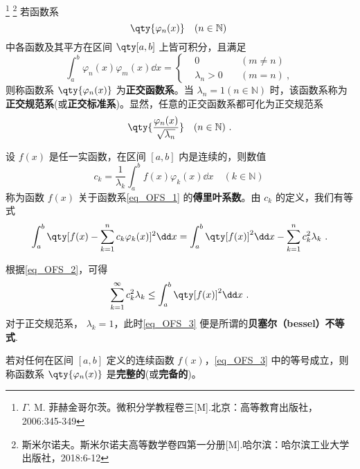 

\footnote{$\Gamma$. M. 菲赫金哥尔茨。微积分学教程\;卷三[M].北京：高等教育出版社，2006:345-349}
\footnote{斯米尔诺夫。斯米尔诺夫高等数学卷四第一分册[M].哈尔滨：哈尔滨工业大学出版社，2018:6-12}
若函数系 
\begin{equation}\label{eq_OFS_1}
\qty{\varphi_n(x)}\quad(n\in \mathbb{N})~
\end{equation}
中各函数及其平方在区间 $\qty[a,b]$ 上皆可积分，且满足
\begin{equation}
\int_a^b\varphi_n(x)\varphi_m(x)\dd x=
\left\{
    \begin{aligned}
    &0\quad &(m\neq n)\\
   &\lambda_n>0\quad &(m=n)~,
    \end{aligned}
\right.
\end{equation}
则称函数系 $\qty{\varphi_n(x)}$ 为\textbf{正交函数系}。当 $\lambda_n=1(n\in\mathbb{N})$ 时，该函数系称为\textbf{正交规范系}(或\textbf{正交标准系})。显然，任意的正交函数系都可化为正交规范系 
\begin{equation}\label{eq_OFS_4}
\qty{\frac{\varphi_n(x)}{\sqrt{\lambda_n}}}\quad(n\in \mathbb{N})~.
\end{equation}

设 $f(x)$ 是任一实函数，在区间 $[a,b]$ 内是连续的，则数值
\begin{equation}
c_k=\frac{1}{\lambda_k}\int_a^b f(x)\varphi_k(x)\dd x\quad (k\in \mathbb{N})~
\end{equation}
称为函数 $f(x)$ 关于函数系\autoref{eq_OFS_1} 的\textbf{傅里叶系数}。由 $c_k$ 的定义，我们有等式
\begin{equation}\label{eq_OFS_2}
\int_a^b\qty[f(x)-\sum_{k=1}^nc_k\varphi_k(x)]^2\dd x=\int_a^b\qty[f(x)]^2\dd x-\sum_{k=1}^nc_k^2\lambda_k~.
\end{equation}

根据\autoref{eq_OFS_2}，可得
\begin{equation}\label{eq_OFS_3}
\sum_{k=1}^\infty c_k^2\lambda_k\leq\int_a^b\qty[f(x)]^2\dd x~.
\end{equation}
对于正交规范系， $\lambda_k=1$，此时\autoref{eq_OFS_3} 便是所谓的\textbf{贝塞尔（bessel）不等式}. 

若对任何在区间 $[a,b]$ 定义的连续函数 $f(x)$，\autoref{eq_OFS_3} 中的等号成立，则称函数系 $\qty{\varphi_n(x)}$ 是\textbf{完整的}(或\textbf{完备的})。
